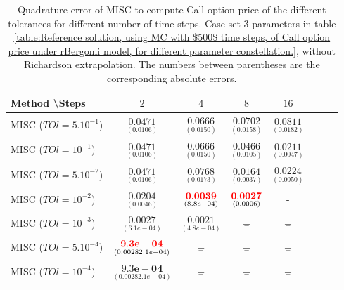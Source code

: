 \documentclass[11pt]{article}
\begin{document}
\begin{table}[h!]
\centering
\begin{tabular}{l*{6}{c}r}
Method \textbackslash  Steps            & $2$ & $4$ & $8$ & $16$  \\
\hline
MISC ($TOl=5.10^{-1}$)  & $\underset{( 0.0106)}{\mathbf{0.0471}}$ & $\underset{(0.0150)}{\mathbf{0.0666}}$ & $\underset{(  0.0158
	)}{\mathbf{  0.0702
}}$ & $\underset{(  0.0182)}{\mathbf{ 0.0811}}$  \\
MISC ($TOl=10^{-1}$)  &  $\underset{( 0.0106)}{\mathbf{0.0471}}$ & $\underset{(0.0150)}{\mathbf{0.0666}}$ & $\underset{(0.0105)}{\mathbf{0.0466}}$ & $\underset{(  0.0047)}{\mathbf{0.0211}}$  \\
MISC ($TOl=5.10^{-2}$)  & $\underset{( 0.0106)}{\mathbf{0.0471}}$ & $\underset{( 0.0173
	)}{\mathbf{
		0.0768}}$ & $\underset{(  0.0037)}{\mathbf{
		0.0164
}}$ & $\underset{(0.0050)}{\mathbf{ 0.0224}}$  \\
MISC ($TOl=10^{-2}$)  & $\underset{(0.0046)}{\mathbf{ 0.0204}}$ & $\underset{( 8.8e-04)}{\mathbf{  {\color{red}0.0039}}}$ & $\underset{(0.0006)}{\mathbf{{\color{red}0.0027}}}$ & $\underset{-}{\mathbf{\text{-}}}$  \\
MISC ($TOl=10^{-3}$)  & $\underset{(      6.1e-04
	)}{\mathbf{  0.0027}}$ & $\underset{(  4.8e-04)}{\mathbf{
		0.0021
}}$ & $\underset{-}{\mathbf{-}}$ & $\underset{-}{\mathbf{-}}$  \\
MISC ($TOl=5.10^{-4}$)  & $\underset{(   0.0028
	2.1e-04)}{\mathbf{     {\color{red} 9.3e-04}
}}$ & $\underset{-}{\mathbf{-}}$ & $\underset{-}{\mathbf{-}}$ & $\underset{-}{\mathbf{-}}$  \\
MISC ($TOl=10^{-4}$)  & $\underset{(   0.0028
	2.1e-04)}{\mathbf{      9.3e-04
}}$ & $\underset{-}{\mathbf{-}}$ & $\underset{-}{\mathbf{-}}$ & $\underset{-}{\mathbf{-}}$  \\
\hline
\end{tabular}
\caption{Quadrature error of MISC to compute Call option price of the different tolerances for different number of time steps. Case  set $3$ parameters in table \ref{table:Reference solution, using MC with $500$ time steps, of Call option price under rBergomi model, for different parameter constellation.}, without Richardson extrapolation. The numbers between parentheses are the corresponding absolute errors.}
\label{Quadrature error of MISC to compute Call option price of the different tolerances for different number of time steps. Case  set $3$ parameters, without Richardson extrapolation. The numbers between parentheses are the corresponding absolute errors.}
\end{table}
\end{document}
